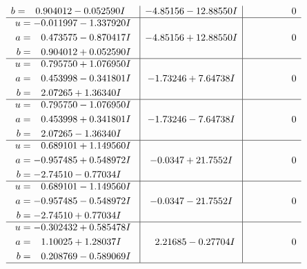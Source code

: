 \documentclass[1p]{elsarticle_modified}
\theoremstyle{definition}
\begin{document}
$$\begin{array}{c|c|c}
\begin{aligned}
b &= \phantom{-}0.904012 - 0.052590 I\end{aligned}
 & -4.85156 - 12.88550 I & \phantom{-0.000000 } 0 \\ \hline\begin{aligned}
u &= -0.011997 - 1.337920 I \\
a &= \phantom{-}0.473575 - 0.870417 I \\
b &= \phantom{-}0.904012 + 0.052590 I\end{aligned}
 & -4.85156 + 12.88550 I & \phantom{-0.000000 } 0 \\ \hline\begin{aligned}
u &= \phantom{-}0.795750 + 1.076950 I \\
a &= \phantom{-}0.453998 - 0.341801 I \\
b &= \phantom{-}2.07265 + 1.36340 I\end{aligned}
 & -1.73246 + 7.64738 I & \phantom{-0.000000 } 0 \\ \hline\begin{aligned}
u &= \phantom{-}0.795750 - 1.076950 I \\
a &= \phantom{-}0.453998 + 0.341801 I \\
b &= \phantom{-}2.07265 - 1.36340 I\end{aligned}
 & -1.73246 - 7.64738 I & \phantom{-0.000000 } 0 \\ \hline\begin{aligned}
u &= \phantom{-}0.689101 + 1.149560 I \\
a &= -0.957485 + 0.548972 I \\
b &= -2.74510 - 0.77034 I\end{aligned}
 & -0.0347 + 21.7552 I & \phantom{-0.000000 } 0 \\ \hline\begin{aligned}
u &= \phantom{-}0.689101 - 1.149560 I \\
a &= -0.957485 - 0.548972 I \\
b &= -2.74510 + 0.77034 I\end{aligned}
 & -0.0347 - 21.7552 I & \phantom{-0.000000 } 0 \\ \hline\begin{aligned}
u &= -0.302432 + 0.585478 I \\
a &= \phantom{-}1.10025 + 1.28037 I \\
b &= \phantom{-}0.208769 - 0.589069 I\end{aligned}
 & \phantom{-}2.21685 - 0.27704 I & \phantom{-0.000000 } 0\\
 \hline 
 \end{array}$$\newpage$$\begin{array}{c|c|c}  

\end{array}$$
\end{document}
